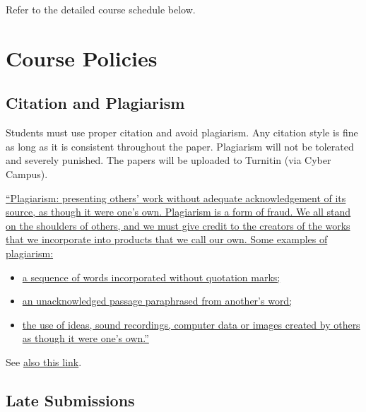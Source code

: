 \documentclass[
  letterpaper,
  DIV=11,
  numbers=noendperiod]{scrartcl}
\begin{document}
Refer to the detailed course schedule below.

\hypertarget{course-policies}{%
\section{\texorpdfstring{{\textbf{Course
Policies}}}{Course Policies}}\label{course-policies}}

\hypertarget{citation-and-plagiarism}{%
\subsection{Citation and Plagiarism}\label{citation-and-plagiarism}}

Students must use proper citation and avoid plagiarism. Any citation
style is fine as long as it is consistent throughout the paper.
Plagiarism will not be tolerated and severely punished. The papers will
be uploaded to Turnitin (via Cyber Campus).

\href{(https://www.nyu.edu/about/policies-guidelines-compliance/policies-and-guidelines/academic-integrity-for-students-at-nyu.html)}{``Plagiarism:
presenting others' work without adequate acknowledgement of its source,
as though it were one's own. Plagiarism is a form of fraud. We all stand
on the shoulders of others, and we must give credit to the creators of
the works that we incorporate into products that we call our own. Some
examples of plagiarism:}

\begin{itemize}
\item
  \href{(https://www.nyu.edu/about/policies-guidelines-compliance/policies-and-guidelines/academic-integrity-for-students-at-nyu.html)}{a
  sequence of words incorporated without quotation marks;}
\item
  \href{(https://www.nyu.edu/about/policies-guidelines-compliance/policies-and-guidelines/academic-integrity-for-students-at-nyu.html)}{an
  unacknowledged passage paraphrased from another's word;}
\item
  \href{(https://www.nyu.edu/about/policies-guidelines-compliance/policies-and-guidelines/academic-integrity-for-students-at-nyu.html)}{the
  use of ideas, sound recordings, computer data or images created by
  others as though it were one's own.''}
\end{itemize}

See
\href{https://owl.purdue.edu/owl/research_and_citation/resources.html}{also
this link}.

\hypertarget{late-submissions}{%
\subsection{Late Submissions}\label{late-submissions}}
\end{document}
